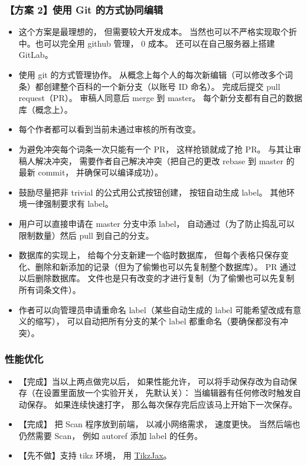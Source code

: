 \subsubsection{【方案 2】使用 Git 的方式协同编辑}
\begin{itemize}
\item 这个方案是最理想的， 但需要较大开发成本。 当然也可以不严格实现取个折中。也可以完全用 github 管理， 0 成本。 还可以在自己服务器上搭建 GitLab。
\item 使用 git 的方式管理协作。 从概念上每个人的每次新编辑（可以修改多个词条）都创建整个百科的一个新分支（以账号 ID 命名）。 完成后提交 pull request（PR）。 审稿人同意后 merge 到 master。 每个新分支都有自己的数据库（概念上）。
\item 每个作者都可以看到当前未通过审核的所有改变。
\item 为避免冲突每个词条一次只能有一个 PR， 这样抢锁就成了抢 PR。 与其让审稿人解决冲突， 需要作者自己解决冲突（把自己的更改 rebase 到 master 的最新 commit， 并确保可以编译成功）。
\item 鼓励尽量把非 trivial 的公式用公式按钮创建， 按钮自动生成 label。 其他环境一律强制要求有 label。
\item 用户可以直接申请在 master 分支中添 label， 自动通过（为了防止捣乱可以限制数量）然后 pull 到自己的分支。
\item 数据库的实现上， 给每个分支新建一个临时数据库， 但每个表格只保存变化、删除和新添加的记录（但为了偷懒也可以先复制整个数据库）。 PR 通过以后删除数据库。 文件也是只有改变的才进行复制（为了偷懒也可以先复制所有词条文件）。
\item 作者可以向管理员申请重命名 label（某些自动生成的 label 可能希望改成有意义的缩写）， 可以自动把所有分支的某个 label 都重命名（要确保都没有冲突）。
\end{itemize}

\subsubsection{性能优化}
\begin{itemize}
\item 【完成】当以上两点做完以后， 如果性能允许， 可以将手动保存改为自动保存（在设置里面放一个实验开关， 先默认关）： 当编辑器有任何修改时触发自动保存。 如果连续快速打字， 那么每次保存完后应该马上开始下一次保存。

\item 【完成】 把 Scan 程序放到前端， 以减小网络需求， 速度更快。 当然后端也仍然需要 Scan， 例如 autoref 添加 label 的任务。

\item 【先不做】支持 tikz 环境， 用 \href{https://github.com/kisonecat/tikzjax}{TikzJax}。
\end{itemize}

